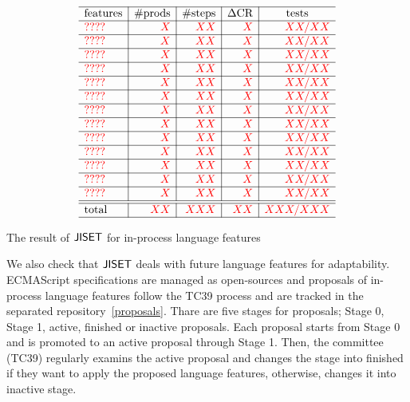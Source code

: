 \begin{table}
  \centering
  \[
    \begin{array}{l|r|r|r|r} \hline
      \text{features} &
      \multicolumn{1}{c|}{\text{\#prods}} &
      \multicolumn{1}{c|}{\text{\#steps}} &
      \multicolumn{1}{c|}{\Delta\text{CR}} &
      \multicolumn{1}{c}{\text{tests}}\\\hline
      \text{\inred{????}} & \inred{X} & \inred{XX} & \inred{X} & \inred{XX/XX}\\\hline
      \text{\inred{????}} & \inred{X} & \inred{XX} & \inred{X} & \inred{XX/XX}\\\hline
      \text{\inred{????}} & \inred{X} & \inred{XX} & \inred{X} & \inred{XX/XX}\\\hline
      \text{\inred{????}} & \inred{X} & \inred{XX} & \inred{X} & \inred{XX/XX}\\\hline
      \text{\inred{????}} & \inred{X} & \inred{XX} & \inred{X} & \inred{XX/XX}\\\hline
      \text{\inred{????}} & \inred{X} & \inred{XX} & \inred{X} & \inred{XX/XX}\\\hline
      \text{\inred{????}} & \inred{X} & \inred{XX} & \inred{X} & \inred{XX/XX}\\\hline
      \text{\inred{????}} & \inred{X} & \inred{XX} & \inred{X} & \inred{XX/XX}\\\hline
      \text{\inred{????}} & \inred{X} & \inred{XX} & \inred{X} & \inred{XX/XX}\\\hline
      \text{\inred{????}} & \inred{X} & \inred{XX} & \inred{X} & \inred{XX/XX}\\\hline
      \text{\inred{????}} & \inred{X} & \inred{XX} & \inred{X} & \inred{XX/XX}\\\hline
      \text{\inred{????}} & \inred{X} & \inred{XX} & \inred{X} & \inred{XX/XX}\\\hline
      \text{\inred{????}} & \inred{X} & \inred{XX} & \inred{X} & \inred{XX/XX}\\\hline
      \hline
      \text{total} & \inred{XX} & \inred{XXX} & \inred{XX} & \inred{XXX/XXX}\\\hline
    \end{array}
  \]
  \caption{The result of \( \text{\sf JISET} \) for in-process language features}
  \label{table:in-process}
\end{table}

We also check that \( \text{\sf JISET} \) deals with future language features for adaptability.
ECMAScript specifications are managed as open-sources and proposals of in-process language
features follow the TC39 process and are tracked in the separated repository~\ref{proposals}.
Thare are five stages for proposals; Stage 0, Stage 1, active, finished or inactive proposals.
Each proposal starts from Stage 0 and is promoted to an active proposal through Stage 1.
Then, the committee (TC39) regularly examins the active proposal and changes the stage into
finished if they want to apply the proposed language features, otherwise, changes it
into inactive stage.



